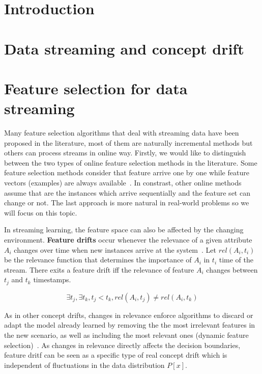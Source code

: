 \documentclass[preprint,12pt]{elsarticle}
\begin{document}

\section{Introduction}
\label{sec:intro}



\section{Data streaming and concept drift}


\section{Feature selection for data streaming}
\label{sec:fs}

Many feature selection algorithms that deal with streaming data have been proposed in the literature, most of them are naturally incremental methods but others can process streams in online way. Firstly, we would like to distinguish between the two types of online feature selection methods in the literature. Some feature selection methods consider that feature arrive one by one while feature vectors (examples) are always available~\citep{wu10, eskandari16}. In constrast, other online methods assume that are the instances which arrive sequentially and the feature set can change or not. The last approach is more natural in real-world problems so we will focus on this topic. 

In streaming learning, the feature space can also be affected by the changing environment. \textbf{Feature drifts} occur whenever the relevance of a given attribute $A_i$ changes over time when new instances arrive at the system~\cite{barddal15}. Let $rel(A_i, t_i)$ be the relevance function that determines the importance of $A_i$ in $t_i$ time of the stream. There exits a feature drift iff the relevance of feature $A_i$ changes between $t_j$ and $t_k$ timestamps.

\begin{equation}\label{eq:rel}
\exists t_j, \exists t_k, t_j < t_k, rel(A_i, t_j) \neq rel(A_i, t_k)
\end{equation}

As in other concept drifts, changes in relevance enforce algorithms to discard or adapt the model already learned by removing the the most irrelevant features in the new scenario, as well as including the most relevant ones (dynamic feature selection)~\cite{nguyen12}. As changes in relevance directly affects the decision boundaries, feature dritf can be seen as a specific type of real concept drift which is independent of fluctuations in the data distribution $P[x]$. 
\end{document}
